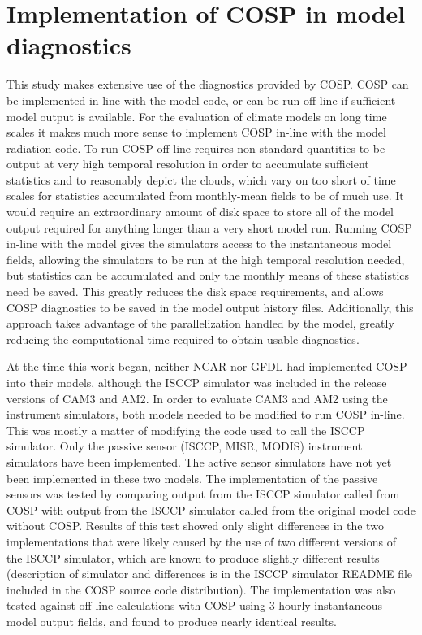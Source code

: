 \section{Implementation of COSP in model diagnostics}
This study makes extensive use of the diagnostics provided by COSP. COSP can be implemented in-line with the model code, or can be run off-line if sufficient model output is available. For the evaluation of climate models on long time scales it makes much more sense to implement COSP in-line with the model radiation code. To run COSP off-line requires non-standard quantities to be output at very high temporal resolution in order to accumulate sufficient statistics and to reasonably depict the clouds, which vary on too short of time scales for statistics accumulated from monthly-mean fields to be of much use. It would require an extraordinary amount of disk space to store all of the model output required for anything longer than a very short model run. Running COSP in-line with the model gives the simulators access to the instantaneous model fields, allowing the simulators to be run at the high temporal resolution needed, but statistics can be accumulated and only the monthly means of these statistics need be saved. This greatly reduces the disk space requirements, and allows COSP diagnostics to be saved in the model output history files. Additionally, this approach takes advantage of the parallelization handled by the model, greatly reducing the computational time required to obtain usable diagnostics.

At the time this work began, neither NCAR nor GFDL had implemented COSP into their models, although the ISCCP simulator was included in the release versions of CAM3 and AM2. In order to evaluate CAM3 and AM2 using the instrument simulators, both models needed to be modified to run COSP in-line. This was mostly a matter of modifying the code used to call the ISCCP simulator. Only the passive sensor (ISCCP, MISR, MODIS) instrument simulators have been implemented. The active sensor simulators have not yet been implemented in these two models. The implementation of the passive sensors was tested by comparing output from the ISCCP simulator called from COSP with output from the ISCCP simulator called from the original model code without COSP. Results of this test showed only slight differences in the two implementations that were likely caused by the use of two different versions of the ISCCP simulator, which are known to produce slightly different results (description of simulator and differences is in the ISCCP simulator README file included in the COSP source code distribution). The implementation was also tested against off-line calculations with COSP using 3-hourly instantaneous model output fields, and found to produce nearly identical results. 

